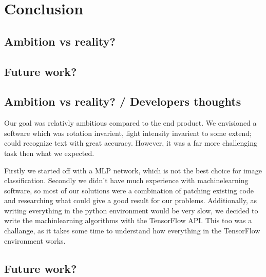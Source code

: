 \documentclass[Report.tex]{subfiles}
\begin{document}
\chapter{Conclusion}
\label{chap:Conclusion}
\section{Ambition vs reality?}
\section{Future work?}


\section{Ambition vs reality? / Developers thoughts}
Our goal was relativly ambitious compared to the end product. We envisioned
a software which was rotation invarient, light intensity invarient to some
extend; could recognize text with great accuracy. However, it was a far more
challenging task then what we expected. \par
Firstly we started off with a MLP network, which is not the best choice for
image classification. Secondly we didn't have much experience with
machinelearning software, so most of our solutions were a combination of
patching existing code and researching what could give a good result for
our problems. Additionally, as writing everything in the python environment
would be very slow, we decided to write the machinlearning algorithms with the
TensorFlow API. This too was a challange, as it takes some time to understand
how everything in the TensorFlow environment works.


\section{Future work?}
\end{document}
